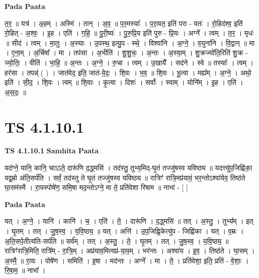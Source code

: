 \documentclass[17pt]{extarticle}
\begin{document}
\textbf{Pada Paata} \newline

त॒र॒ ॥ यत्र॑ । अ॒हम् । अस्मि॑ । तान् । अ॒व॒ ॥ प॒र॒मस्याः᳚ । प॒रा॒वत॒ इति॑ परा - वतः॑ । रो॒हिद॑श्व॒ इति॑ रो॒हित् - अ॒श्वः॒ । इ॒ह । एति॑ । ग॒हि॒ ॥ पु॒री॒ष्यः॑ । पु॒रु॒प्रि॒य इति॑ पुरु - प्रि॒यः । अग्ने᳚ । त्वम् । त॒र॒ । मृधः॑ ॥ सीद॑ । त्वम् । मा॒तुः । अ॒स्याः । उ॒पस्थ॒ इत्यु॒प - स्थे॒ । विश्वा॑नि । अ॒ग्ने॒ । व॒युना॑नि । वि॒द्वान् ॥ मा । ए॒ना॒म् । अ॒र्चिषा᳚ । मा । तप॑सा । अ॒भीति॑ । शू॒शु॒चः॒ । अ॒न्तः । अ॒स्या॒म् । शु॒क्रज्यो॑ति॒रिति॑ शु॒क्र - ज्यो॒तिः॒ । वीति॑ । भा॒हि॒ ॥ अ॒न्तः । अ॒ग्ने॒ । रु॒चा । त्वम् । उ॒खायै᳚ । सद॑ने । स्वे ॥ तस्याः᳚ । त्वम् । हर॑सा । तपन्न्॑ ( ) । जात॑वेद॒ इति॒ जात॑-वे॒दः॒ । शि॒वः । भ॒व॒ ॥ शि॒वः । भू॒त्वा । मह्य᳚म् । अ॒ग्ने॒ । अथो॒ इति॑ । सी॒द॒ । शि॒वः । त्वम् ॥ शि॒वाः । कृ॒त्वा । दिशः॑ । सर्वाः᳚ । स्वाम् । योनि᳚म् । इ॒ह । एति॑ । अ॒स॒दः॒ ॥  \newline




\section*{ TS 4.1.10.1 }

\textbf{TS 4.1.10.1 } \newline
\textbf{Samhita Paata} \newline

यद॑ग्ने॒ यानि॒ कानि॒ चाऽऽते॒ दारू॑णि द॒द्ध्मसि॑ । तद॑स्तु॒ तुभ्य॒मिद्-घृ॒तं तज्जु॑षस्व यविष्ठ्य ॥ यदत्त्यु॑प॒जिह्वि॑का॒ यद्व॒म्रो अ॑ति॒सर्प॑ति । सर्वं॒ तद॑स्तु ते घृ॒तं तज्जु॑षस्व यविष्ठ्य ॥ रात्रिꣳ॑ रात्रि॒मप्र॑यावं॒ भर॒न्तोऽश्वा॑येव॒ तिष्ठ॑ते घा॒सम॑स्मै । रा॒यस्पोषे॑ण॒ समि॒षा मद॒न्तोऽग्ने॒ मा ते॒ प्रति॑वेशा रिषाम ॥ नाभा॑ - [  ] \newline

\textbf{Pada Paata} \newline

यत् । अ॒ग्ने॒ । यानि॑ । कानि॑ । च॒ । एति॑ । ते॒ । दारू॑णि । द॒द्ध्मसि॑ ॥ तत् । अ॒स्तु॒ । तुभ्य᳚म् । इत् । घृ॒तम् । तत् । जु॒ष॒स्व॒ । य॒वि॒ष्ठ्य॒ ॥ यत् । अत्ति॑ । उ॒प॒जिह्वि॒केत्यु॑प - जिह्वि॑का । यत् । व॒म्रः । अ॒ति॒सर्प॒तीत्य॑ति-सर्प॑ति ॥ सर्व᳚म् । तत् । अ॒स्तु॒ । ते॒ । घृ॒तम् । तत् । जु॒ष॒स्व॒ । य॒वि॒ष्ठ्य॒ ॥ रात्रिꣳ॑रात्रि॒मिति॒ रात्रि᳚म् - रा॒त्रि॒म् । अप्र॑याव॒मित्यप्र॑-या॒व॒म् । भर॑न्तः । अश्वा॑य । इ॒व॒ । तिष्ठ॑ते । घा॒सम् । अ॒स्मै॒ ॥ रा॒यः । पोषे॑ण । समिति॑ । इ॒षा । मद॑न्तः । अग्ने᳚ । मा । ते॒ । प्रति॑वेशा॒ इति॒ प्रति॑ - वे॒शाः॒ । रि॒षा॒म॒ ॥ नाभा᳚ ।  \newline
\end{document}
